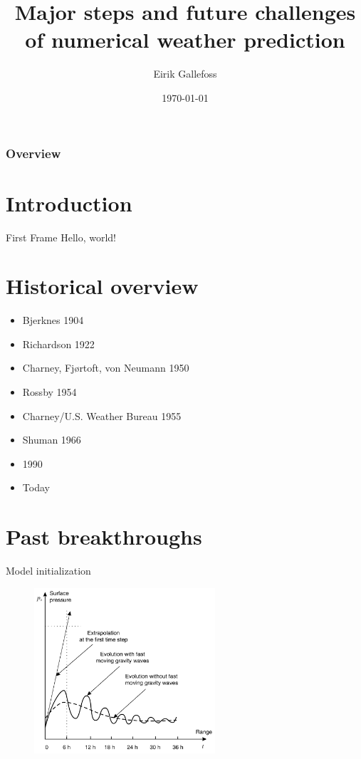 \documentclass{beamer}
\title{Major steps and future challenges of numerical weather prediction}
\date{\today}
\author{Eirik Gallefoss}
\institute{Geologisk institutt - Universitetet i Oslo}
\begin{document}
\begin{frame}
  \titlepage
\end{frame}


\begin{frame}
  \frametitle{Overview}
  \tableofcontents
\end{frame}


\section{Introduction}
  \begin{frame}{First Frame}
    Hello, world!
  \end{frame}

\section{Historical overview}

\begin{frame}{}
  \begin{itemize}
    \item Bjerknes 1904
    \item Richardson 1922
    \item Charney, Fjørtoft, von Neumann 1950
    \item Rossby 1954

    \item Charney/U.S. Weather Bureau 1955
    \item Shuman 1966
    \item 1990
    \item Today

  \end{itemize}
\end{frame}


\section{Past breakthroughs}

\begin{frame}{Model initialization}
  \begin{figure}[H]
    \centering
    \includegraphics[width=0.6\textwidth]{../figures/nwp_pressure}

    \parencite{nwp}
  \end{figure}

\end{frame}
\end{document}
